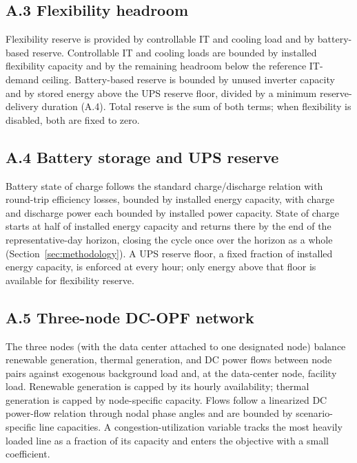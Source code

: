 \documentclass[preprint,12pt]{elsarticle}
\begin{document}
\subsection*{A.3 Flexibility headroom}
Flexibility reserve is provided by controllable IT and cooling load and by battery-based reserve. Controllable IT and cooling loads are bounded by installed flexibility capacity and by the remaining headroom below the reference IT-demand ceiling. Battery-based reserve is bounded by unused inverter capacity and by stored energy above the UPS reserve floor, divided by a minimum reserve-delivery duration (A.4). Total reserve is the sum of both terms; when flexibility is disabled, both are fixed to zero.

\subsection*{A.4 Battery storage and UPS reserve}
Battery state of charge follows the standard charge/discharge relation with round-trip efficiency losses, bounded by installed energy capacity, with charge and discharge power each bounded by installed power capacity. State of charge starts at half of installed energy capacity and returns there by the end of the representative-day horizon, closing the cycle once over the horizon as a whole (Section~\ref{sec:methodology}). A UPS reserve floor, a fixed fraction of installed energy capacity, is enforced at every hour; only energy above that floor is available for flexibility reserve.

\subsection*{A.5 Three-node DC-OPF network}
The three nodes (with the data center attached to one designated node) balance renewable generation, thermal generation, and DC power flows between node pairs against exogenous background load and, at the data-center node, facility load. Renewable generation is capped by its hourly availability; thermal generation is capped by node-specific capacity. Flows follow a linearized DC power-flow relation through nodal phase angles and are bounded by scenario-specific line capacities. A congestion-utilization variable tracks the most heavily loaded line as a fraction of its capacity and enters the objective with a small coefficient.
\end{document}
